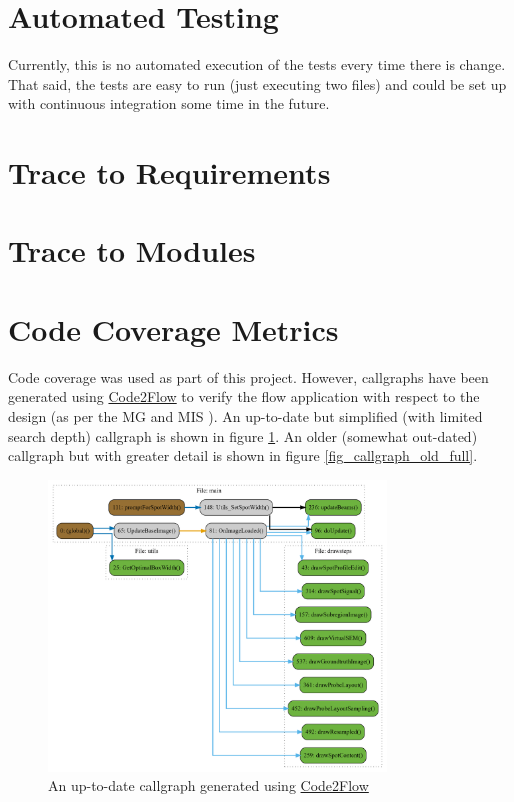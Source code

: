 \documentclass[12pt, titlepage]{article}
\begin{document}
\section{Automated Testing}
Currently, this is no automated execution of the tests every time there is change.
That said, the tests are easy to run (just executing two files) and could be set up with
continuous integration some time in the future.

\section{Trace to Requirements}

\section{Trace to Modules}

\section{Code Coverage Metrics}
Code coverage was used as part of this project. However, callgraphs have been generated using
\href{https://github.com/scottrogowski/code2flow}{Code2Flow}
to verify the flow application with respect to the design (as per the MG \cite{MG} and MIS \cite{MIS}).
An up-to-date but simplified (with limited search depth) callgraph is shown in figure \ref{fig_callgraph_simple}.
An older (somewhat out-dated) callgraph but with greater detail is shown in figure \ref{fig_callgraph_old_full}.

\begin{figure}[h!]
  \begin{center}
   \includegraphics[width=0.8\textwidth]{callgraph/simple.png}
  \caption{An up-to-date callgraph generated using \href{https://github.com/scottrogowski/code2flow}{Code2Flow}}
  \label{fig_callgraph_simple} 
  \end{center}
\end{figure}
\end{document}
